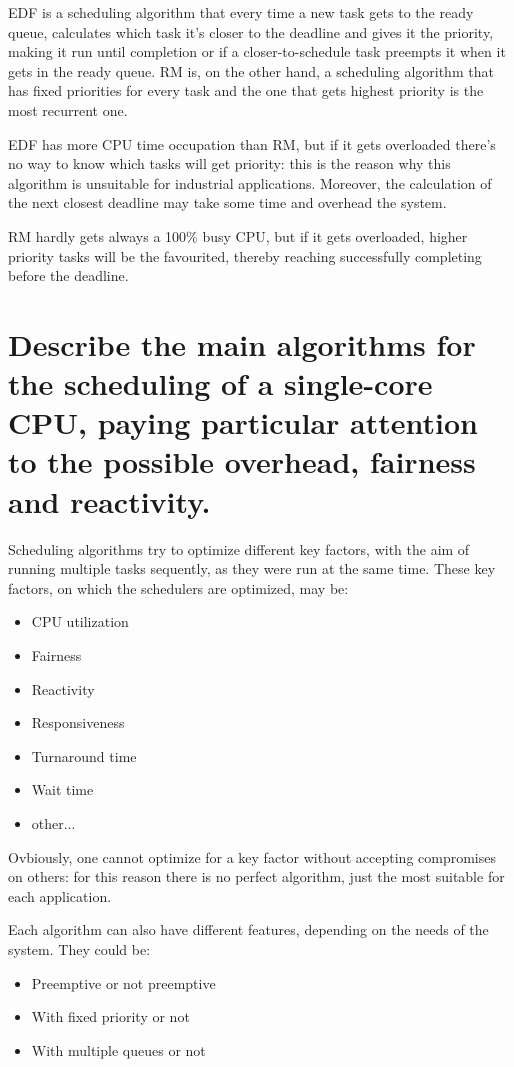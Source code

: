 EDF is a scheduling algorithm that every time a new task gets to the ready queue, calculates which task it's closer to the deadline and gives it the priority, making it run until completion or if a closer-to-schedule task preempts it when it gets in the ready queue. 
RM is, on the other hand, a scheduling algorithm that has fixed priorities for every task and the one that gets highest priority is the most recurrent one.

EDF has more CPU time occupation than RM, but if it gets overloaded there's no way to know which tasks will get priority: this is the reason why this algorithm is unsuitable for industrial applications. Moreover, the calculation of the next closest deadline may take some time and overhead the system.

RM hardly gets always a 100\% busy CPU, but if it gets overloaded, higher priority tasks will be the favourited, thereby reaching successfully completing before the deadline.

\section{Describe the main algorithms for the scheduling of a single-core CPU, paying particular attention to the possible overhead, fairness and reactivity.}

Scheduling algorithms try to optimize different key factors, with the aim of running multiple tasks sequently, as they were run at the same time.
These key factors, on which the schedulers are optimized, may be:
\begin{itemize}
	\item CPU utilization
	\item Fairness
	\item Reactivity
	\item Responsiveness
	\item Turnaround time
	\item Wait time
	\item other...
\end{itemize}

Ovbiously, one cannot optimize for a key factor without accepting compromises on others: for this reason there is no perfect algorithm, just the most suitable for each application.

Each algorithm can also have different features, depending on the needs of the system. They could be:
\begin{itemize}
	\item Preemptive or not preemptive
	\item With fixed priority or not
	\item With multiple queues or not
\end{itemize}

